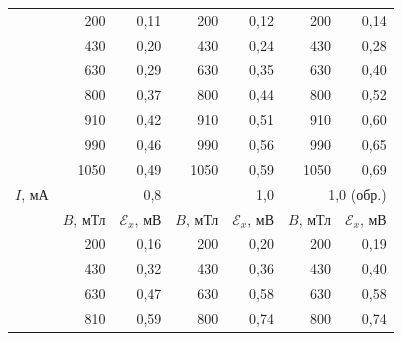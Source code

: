 \begin{longtable}[c]{c|rr|rr|rr|}
	& \multicolumn{1}{r|}{200}   & 0,11               & \multicolumn{1}{r|}{200}   & 0,12               & \multicolumn{1}{r|}{200}   & 0,14               \\ \cline{2-7} 
	& \multicolumn{1}{r|}{430}   & 0,20               & \multicolumn{1}{r|}{430}   & 0,24               & \multicolumn{1}{r|}{430}   & 0,28               \\ \cline{2-7} 
	& \multicolumn{1}{r|}{630}   & 0,29               & \multicolumn{1}{r|}{630}   & 0,35               & \multicolumn{1}{r|}{630}   & 0,40               \\ \cline{2-7} 
	& \multicolumn{1}{r|}{800}   & 0,37               & \multicolumn{1}{r|}{800}   & 0,44               & \multicolumn{1}{r|}{800}   & 0,52               \\ \cline{2-7} 
	& \multicolumn{1}{r|}{910}   & 0,42               & \multicolumn{1}{r|}{910}   & 0,51               & \multicolumn{1}{r|}{910}   & 0,60               \\ \cline{2-7} 
	& \multicolumn{1}{r|}{990}   & 0,46               & \multicolumn{1}{r|}{990}   & 0,56               & \multicolumn{1}{r|}{990}   & 0,65               \\ \cline{2-7} 
	& \multicolumn{1}{r|}{1050}  & 0,49               & \multicolumn{1}{r|}{1050}  & 0,59               & \multicolumn{1}{r|}{1050}  & 0,69               \\ \hline
	\multicolumn{1}{|c|}{$I$, мА} & \multicolumn{2}{r|}{0,8}                          & \multicolumn{2}{r|}{1,0}                          & \multicolumn{2}{r|}{1,0 (обр.)}                \\ \hline
	& \multicolumn{1}{c|}{$B$, мТл} & $\mathcal{E}_x$, мВ & \multicolumn{1}{c|}{$B$, мТл} & $\mathcal{E}_x$, мВ & \multicolumn{1}{c|}{$B$, мТл} & $\mathcal{E}_x$, мВ \\ \cline{2-7} 
	& \multicolumn{1}{r|}{200}   & 0,16               & \multicolumn{1}{r|}{200}   & 0,20               & \multicolumn{1}{r|}{200}   & 0,19               \\ \cline{2-7} 
	& \multicolumn{1}{r|}{430}   & 0,32               & \multicolumn{1}{r|}{430}   & 0,36               & \multicolumn{1}{r|}{430}   & 0,40               \\ \cline{2-7} 
	& \multicolumn{1}{r|}{630}   & 0,47               & \multicolumn{1}{r|}{630}   & 0,58               & \multicolumn{1}{r|}{630}   & 0,58               \\ \cline{2-7} 
	& \multicolumn{1}{r|}{810}   & 0,59               & \multicolumn{1}{r|}{800}   & 0,74               & \multicolumn{1}{r|}{800}   & 0,74               \\ \cline{2-7} 

\end{longtable}
